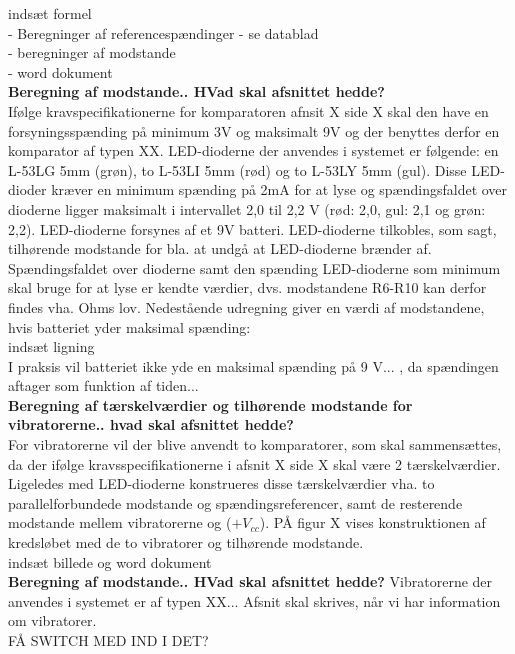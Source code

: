 indsæt formel \\

- Beregninger af referencespændinger - se datablad \\
- beregninger af modstande \\
- word dokument \\

\textbf{Beregning af modstande.. HVad skal afsnittet hedde?} \\
Ifølge kravspecifikationerne for komparatoren afnsit X side X skal den have en forsyningsspænding på minimum 3V og maksimalt 9V og der benyttes derfor en komparator af typen XX. LED-dioderne der anvendes i systemet er følgende: en L-53LG 5mm (grøn), to L-53LI 5mm (rød) og to L-53LY 5mm (gul). Disse LED-dioder kræver en minimum spænding på 2mA for at lyse og spændingsfaldet over dioderne ligger maksimalt i intervallet 2,0 til 2,2 V (rød: 2,0, gul: 2,1 og grøn: 2,2). LED-dioderne forsynes af et 9V batteri. LED-dioderne tilkobles, som sagt, tilhørende modstande for bla. at undgå at LED-dioderne brænder af. Spændingsfaldet over dioderne samt den spænding LED-dioderne som minimum skal bruge for at lyse er kendte værdier, dvs. modstandene R6-R10 kan derfor findes vha. Ohms lov. Nedestående udregning giver en værdi af modstandene, hvis batteriet yder maksimal spænding: \\

indsæt ligning \\

I praksis vil batteriet ikke yde en maksimal spænding på 9 V... , da spændingen aftager som funktion af tiden... \\

\textbf{Beregning af tærskelværdier og tilhørende modstande for vibratorerne.. hvad skal afsnittet hedde?} \\
For vibratorerne vil der blive anvendt to komparatorer, som skal sammensættes, da der ifølge kravsspecifikationerne i afsnit X side X skal være 2 tærskelværdier. Ligeledes med LED-dioderne konstrueres disse tærskelværdier vha. to parallelforbundede modstande og spændingsreferencer, samt de resterende modstande mellem vibratorerne og ($+V_{cc}$). PÅ figur X vises konstruktionen af kredsløbet med de to vibratorer og tilhørende modstande. \\

indsæt billede og word dokument \\

\textbf{Beregning af modstande.. HVad skal afsnittet hedde?}
Vibratorerne der anvendes i systemet er af typen XX... Afsnit skal skrives, når vi har information om vibratorer.  \\

FÅ SWITCH MED IND I DET? \\